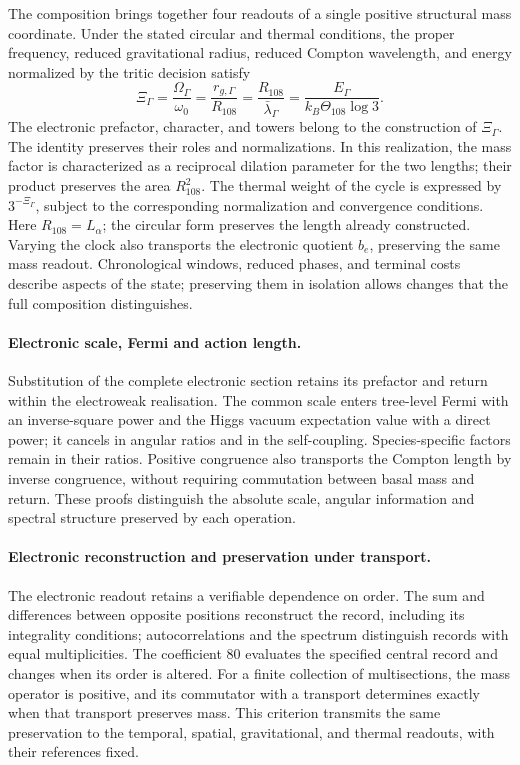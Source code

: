 The composition brings together four readouts of a single positive
structural mass coordinate. Under the stated circular and thermal
conditions, the proper frequency, reduced gravitational radius, reduced
Compton wavelength, and energy normalized by the tritic decision satisfy
\[
 \Xi_\Gamma=
 \frac{\Omega_\Gamma}{\omega_0}
 =\frac{r_{g,\Gamma}}{R_{108}}
 =\frac{R_{108}}{\bar\lambda_\Gamma}
 =\frac{E_\Gamma}{k_B\Theta_{108}\log3}.
\]
The electronic prefactor, character, and towers belong to the
construction of \(\Xi_\Gamma\). The identity preserves their roles
and normalizations. In this realization, the mass factor is
characterized as a reciprocal dilation parameter for the two lengths;
their product preserves the area \(R_{108}^2\). The thermal weight of
the cycle is expressed by \(3^{-\Xi_\Gamma}\), subject to the
corresponding normalization and convergence conditions.
Here $R_{108}=L_\alpha$; the circular form preserves the length already
constructed. Varying the clock also transports the electronic quotient
$b_e$, preserving the same mass readout. Chronological windows,
reduced phases, and terminal costs describe aspects of the state;
preserving them in isolation allows changes that the full composition
distinguishes.

\paragraph{Electronic scale, Fermi and action length.}
Substitution of the complete electronic section retains its prefactor
and return within the electroweak realisation. The common scale enters
tree-level Fermi with an inverse-square power and the Higgs vacuum
expectation value with a direct power; it cancels in angular ratios and
in the self-coupling. Species-specific factors remain in their ratios.
Positive congruence also transports the Compton length by inverse
congruence, without requiring commutation between basal mass and return.
These proofs distinguish the absolute scale, angular information and
spectral structure preserved by each operation.

\paragraph{Electronic reconstruction and preservation under transport.}
The electronic readout retains a verifiable dependence on order.
The sum and differences between opposite positions reconstruct the
record, including its integrality conditions; autocorrelations and
the spectrum distinguish records with equal multiplicities. The
coefficient $80$ evaluates the specified central record and changes
when its order is altered. For a finite collection of multisections,
the mass operator is positive, and its commutator with a transport
determines exactly when that transport preserves mass. This criterion
transmits the same preservation to the temporal, spatial, gravitational,
and thermal readouts, with their references fixed.

